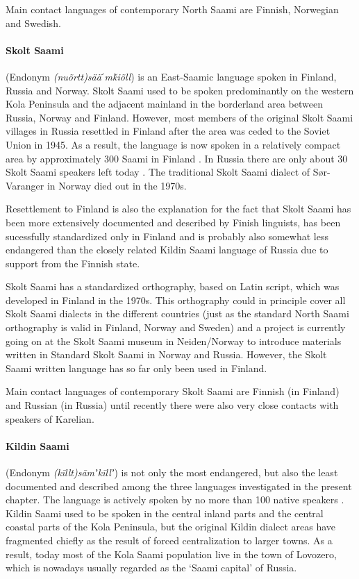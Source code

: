 \documentclass[a4,12pt]{scrartcl}
\begin{document}
Main contact languages of contemporary North Saami are Finnish, Norwegian and Swedish.

\paragraph{Skolt Saami} (Endonym {\it (nuõrtt)sääˊmǩiõll}) is an East-Saamic language spoken in Finland, Russia and Norway. Skolt Saami used to be spoken predominantly on the western Kola Peninsula and the adjacent mainland in the borderland area between Russia, Norway and Finland. However, most members of the original Skolt Saami villages in Russia resettled in Finland after the area was ceded to the Soviet Union in 1945. As a result, the language is now spoken in a relatively compact area by approximately 300 Saami in Finland \cite[??PAGE??]{salminen2007}. In Russia there are only about 30 Skolt Saami speakers left today \cite[??PAGE??]{scheller2011}. The traditional Skolt Saami dialect of Sør-Varanger in Norway died out in the 1970s.

Resettlement to Finland is also the explanation for the fact that Skolt Saami has been more extensively documented and described by Finish linguists, has been sucessfully standardized only in Finland and is probably also somewhat less endangered than the closely related Kildin Saami language of Russia due to support from the Finnish state. 

Skolt Saami has a standardized orthography, based on Latin script, which was developed in Finland in the 1970s. This orthography could in principle cover all Skolt Saami dialects in the different countries (just as the standard North Saami orthography is valid in Finland, Norway and Sweden) and a project is currently going on at the Skolt Saami museum in Neiden/Norway to introduce materials written in Standard Skolt Saami in Norway and Russia. However, the Skolt Saami written language has so far only been used in Finland. 

Main contact languages of contemporary Skolt Saami are Finnish (in Finland) and Russian (in Russia) until recently there were also very close contacts with speakers of Karelian.

\paragraph{Kildin Saami} (Endonym {\it (kīllt)sāmʼkīllʼ}) is not only the most endangered, but also the least documented and described among the three languages investigated in the present chapter. The language is actively spoken by no more than 100 native speakers \cite[??PAGE??]{scheller2011}. Kildin Saami used to be spoken in the central inland parts and the central coastal parts of the Kola Peninsula, but the original Kildin dialect areas have fragmented chiefly as the result of forced centralization to larger towns. As a result, today most of the Kola Saami population live in the town of Lovozero, which is nowadays usually regarded as the ‘Saami capital’ of Russia.
\end{document}
